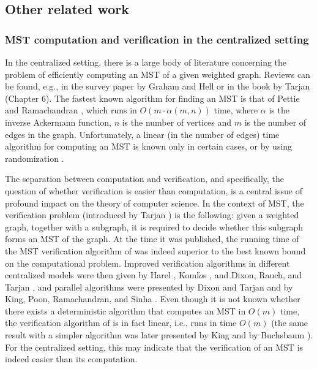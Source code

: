 \documentclass[11pt,letter]{article}
\begin{document}
\subsection{Other related work}
\subsubsection{MST computation and verification in the centralized setting}  In the centralized setting, there is a large body of literature concerning the
problem of efficiently computing an MST of a given weighted graph.
Reviews can be found, e.g., in the survey paper by Graham and Hell \cite{GH85} 
or in the book by Tarjan \cite{T83} (Chapter 6). 
The fastest known algorithm for finding an MST is that of 
Pettie and Ramachandran  \cite{optimalMST}, which runs
in $O(m\cdot\alpha(m,n))$ time, where $\alpha$ is 
 the inverse Ackermann function, 
$n$ is the number of vertices 
and $m$ is the number of edges in the graph. 
Unfortunately, a linear (in the number of edges) time algorithm 
for computing an MST is known only in certain cases, or by using randomization
\cite{FredmanWillard,KargerKleinTarjan}. 

The separation between computation and verification, and specifically,
the question of whether verification is easier than computation, is a central 
issue of profound impact on the theory of computer science. 
In the context of MST, the  verification problem 
(introduced by Tarjan \cite{Tarjan79}) is the following:
given a weighted graph, together with a subgraph, 
it is required to decide whether this subgraph forms an MST of the graph. 
At the time it was published, the running time of the MST verification 
algorithm of \cite{Tarjan79} was indeed superior to the best known bound
on the computational problem. Improved verification  algorithms in different
centralized models were then given by Harel \cite{Harel85},
Koml$\grave{o}$s \cite{Komlos}, and Dixon, Rauch, and Tarjan
\cite{DixonRauchTarjan}, and parallel algorithms were presented by Dixon and
Tarjan \cite{DixonTarjan} and by King, Poon, Ramachandran, and Sinha
\cite{king2}. 
Even though it is not known whether there exists a deterministic algorithm that 
computes an MST in $O(m)$  time, the verification algorithm of 
\cite{DixonRauchTarjan} is in fact linear, i.e., runs in time $O(m)$ (the same result with a simpler 
algorithm was later presented by King \cite{king97} and by Buchsbaum \cite{BGKRTW_08}). 
For the centralized setting, this may indicate that the verification 
of an MST is indeed easier than its computation.
\end{document}
